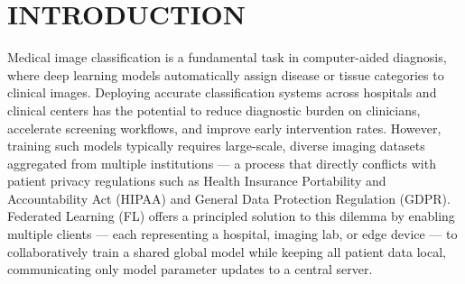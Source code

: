 
\chapter{INTRODUCTION}  %

\ifpdf
    \graphicspath{{Chapter1/Figs/Raster/}{Chapter1/Figs/PDF/}{Chapter1/Figs/}}
\else
    \graphicspath{{Chapter1/Figs/Vector/}{Chapter1/Figs/}}
\fi


Medical image classification is a fundamental task in computer-aided diagnosis, where deep learning models automatically assign disease or tissue categories to clinical images. Deploying accurate classification systems across hospitals and clinical centers has the potential to reduce diagnostic burden on clinicians, accelerate screening workflows, and improve early intervention rates. However, training such models typically requires large-scale, diverse imaging datasets aggregated from multiple institutions — a process that directly conflicts with patient privacy regulations such as Health Insurance Portability and Accountability Act (HIPAA) and  General Data Protection Regulation (GDPR). Federated Learning (FL) offers a principled solution to this dilemma by enabling multiple clients — each representing a hospital, imaging lab, or edge device — to collaboratively train a shared global model while keeping all patient data local, communicating only model parameter updates to a central server.






